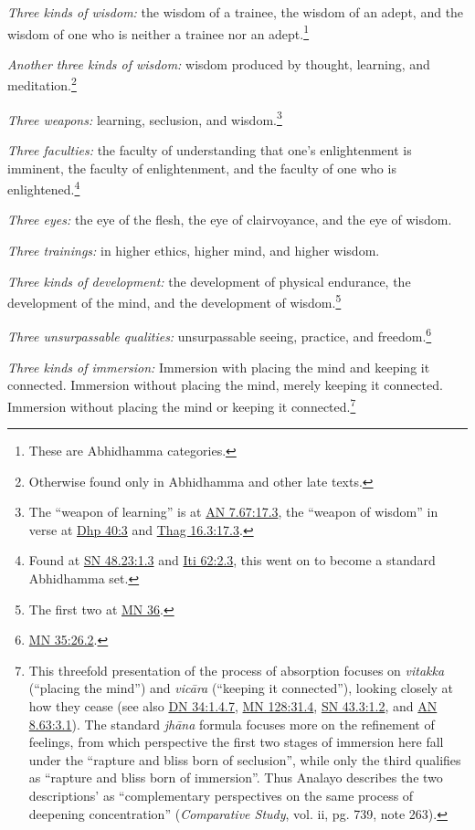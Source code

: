 \documentclass[12pt,openany]{book}%
\begin{document}
\emph{Three kinds of wisdom:} the wisdom of a trainee, the wisdom of an adept, and the wisdom of one who is neither a trainee nor an adept.\footnote{These are Abhidhamma categories. } 

\emph{Another three kinds of wisdom:} wisdom produced by thought, learning, and meditation.\footnote{Otherwise found only in Abhidhamma and other late texts. } 

\emph{Three weapons:} learning, seclusion, and wisdom.\footnote{The “weapon of learning” is at \href{https://suttacentral.net/an7.67/en/sujato\#17.3}{AN 7.67:17.3}, the “weapon of wisdom” in verse at \href{https://suttacentral.net/dhp40/en/sujato\#3}{Dhp 40:3} and \href{https://suttacentral.net/thag16.3/en/sujato\#17.3}{Thag 16.3:17.3}. } 

\emph{Three faculties:} the faculty of understanding that one’s enlightenment is imminent, the faculty of enlightenment, and the faculty of one who is enlightened.\footnote{Found at \href{https://suttacentral.net/sn48.23/en/sujato\#1.3}{SN 48.23:1.3} and \href{https://suttacentral.net/iti62/en/sujato\#2.3}{Iti 62:2.3}, this went on to become a standard Abhidhamma set. } 

\emph{Three eyes:} the eye of the flesh, the eye of clairvoyance, and the eye of wisdom. 

\emph{Three trainings:} in higher ethics, higher mind, and higher wisdom. 

\emph{Three kinds of development:} the development of physical endurance, the development of the mind, and the development of wisdom.\footnote{The first two at \href{https://suttacentral.net/mn36/en/sujato}{MN 36}. } 

\emph{Three unsurpassable qualities:} unsurpassable seeing, practice, and freedom.\footnote{\href{https://suttacentral.net/mn35/en/sujato\#26.2}{MN 35:26.2}. } 

\emph{Three kinds of immersion:} Immersion with placing the mind and keeping it connected. Immersion without placing the mind, merely keeping it connected. Immersion without placing the mind or keeping it connected.\footnote{This threefold presentation of the process of absorption focuses on \textit{vitakka} (“placing the mind”) and \textit{\textsanskrit{vicāra}} (“keeping it connected”), looking closely at how they cease (see also \href{https://suttacentral.net/dn34/en/sujato\#1.4.7}{DN 34:1.4.7}, \href{https://suttacentral.net/mn128/en/sujato\#31.4}{MN 128:31.4}, \href{https://suttacentral.net/sn43.3/en/sujato\#1.2}{SN 43.3:1.2}, and \href{https://suttacentral.net/an8.63/en/sujato\#3.1}{AN 8.63:3.1}). The standard \textit{\textsanskrit{jhāna}} formula focuses more on the refinement of feelings, from which perspective the first two stages of immersion here fall under the “rapture and bliss born of seclusion”, while only the third qualifies as “rapture and bliss born of immersion”. Thus Analayo describes the two descriptions' as “complementary perspectives on the same process of deepening concentration” (\emph{Comparative Study}, vol. ii, pg. 739, note 263). } 
\end{document}
